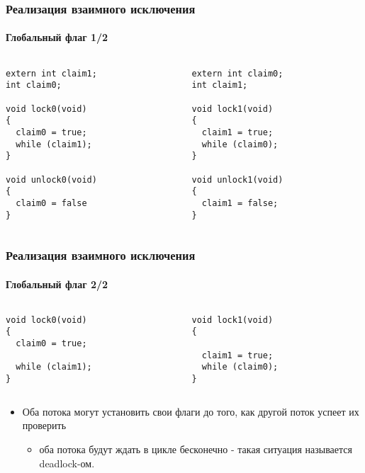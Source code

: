 \begin{frame}[fragile]
\frametitle{Реализация взаимного исключения}
\framesubtitle{Глобальный флаг 1/2}
\begin{columns}
  \begin{column}{.45\linewidth}
    \begin{lstlisting}
extern int claim1;
int claim0;

void lock0(void)
{
  claim0 = true;
  while (claim1);
}

void unlock0(void)
{
  claim0 = false
}
    \end{lstlisting}
  \end{column}
  \begin{column}{.45\linewidth}
    \begin{lstlisting}
extern int claim0;
int claim1;

void lock1(void)
{
  claim1 = true;
  while (claim0);
}

void unlock1(void)
{
  claim1 = false;
}
    \end{lstlisting}
  \end{column}
\end{columns}
\end{frame}

\begin{frame}[fragile]
\frametitle{Реализация взаимного исключения}
\framesubtitle{Глобальный флаг 2/2}
\begin{columns}
  \begin{column}{.45\linewidth}
    \begin{lstlisting}[basicstyle=\small]
void lock0(void)
{
  claim0 = true;

  while (claim1);
}
    \end{lstlisting}
  \end{column}
  \begin{column}{.45\linewidth}
    \begin{lstlisting}[basicstyle=\small]
void lock1(void)
{

  claim1 = true;
  while (claim0);
}
    \end{lstlisting}
  \end{column}
\end{columns}
\begin{itemize}
  \item Оба потока могут установить свои флаги до того, как другой поток
  успеет их проверить
  \begin{itemize}
    \item оба потока будут ждать в цикле бесконечно - такая ситуация называется
    deadlock-ом.
  \end{itemize}
\end{itemize}
\end{frame}

